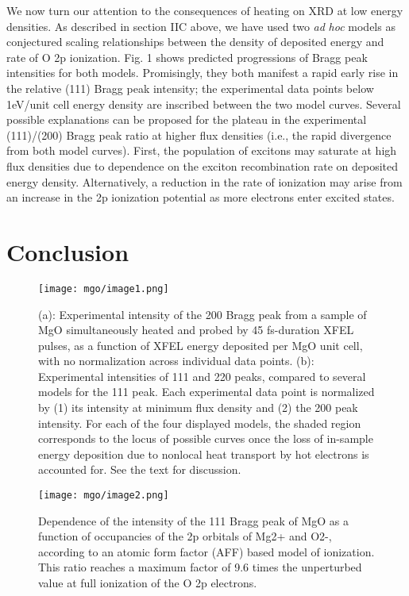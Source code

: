 We now turn our attention to the consequences of heating on XRD at low
energy densities. As described in section IIC above, we have used two
\emph{ad} \emph{hoc} models as conjectured scaling relationships between
the density of deposited energy and rate of O 2p ionization. Fig. 1
shows predicted progressions of Bragg peak intensities for both models.
Promisingly, they both manifest a rapid early rise in the relative (111)
Bragg peak intensity; the experimental data points below 1eV/unit cell
energy density are inscribed between the two model curves. Several
possible explanations can be proposed for the plateau in the
experimental (111)/(200) Bragg peak ratio at higher flux densities
(i.e., the rapid divergence from both model curves). First, the
population of excitons may saturate at high flux densities due to
dependence on the exciton recombination rate on deposited energy
density. Alternatively, a reduction in the rate of ionization may arise
from an increase in the 2p ionization potential as more electrons enter
excited states. 


\section{Conclusion} %

\begin{figure}[h]
\caption{
(a): Experimental intensity of the 200 Bragg peak from
a sample of MgO simultaneously heated and probed by 45 fs-duration XFEL
pulses, as a function of XFEL energy deposited per MgO unit cell, with
no normalization across individual data points. (b): Experimental
intensities of 111 and 220 peaks, compared to several models for the 111
peak. Each experimental data point is normalized by (1) its intensity at
minimum flux density and (2) the 200 peak intensity. For each of the
four displayed models, the shaded region corresponds to the locus of
possible curves once the loss of in-sample energy deposition due to
nonlocal heat transport by hot electrons is accounted for. See the text
for discussion.
}
\centering
\texttt{[image: mgo/image1.png]}
\end{figure}

\begin{figure}[h]
\caption{
Dependence of the intensity of the 111 Bragg peak of
MgO as a function of occupancies of the 2p orbitals of Mg2+ and O2-,
according to an atomic form factor (AFF) based model of ionization. This
ratio reaches a maximum factor of 9.6 times the unperturbed value at
full ionization of the O 2p electrons.
}
\centering
\texttt{[image: mgo/image2.png]}
\end{figure}

